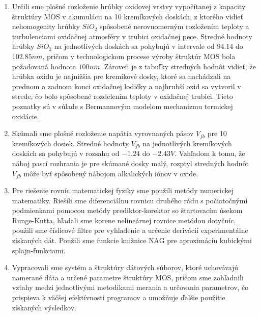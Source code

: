 \begin{enumerate}
\item Určili sme plošné rozloženie hrúbky oxidovej vrstvy vypočítanej
  z kapacity štruktúry MOS v akumulácii na 10 kremíkových doskách, z
  ktorého vidieť nehomogenity hrúbky $SiO_{2}$ spôsobené nerovnomerným
  rozložením teploty a turbulenciami oxidačnej atmosféry v trubici
  oxidačnej pece.
  Stredné hodnoty hrúbky $SiO_{2}$ na jednotlivých doskách sa pohybujú
  v intervale od $94.14$ do $102.85nm$, pričom v technologickom
  procese výroby štruktúr MOS bola požadovaná hodnota $100 nm$.
  Zároveň je z tabuľky stredných hodnôt vidieť, že hrúbka oxidu je
  najnižšia pre kremíkové dosky, ktoré sa nachádzali na prednom a
  zadnom konci oxidačnej lodičky a najhrubší oxid sa vytvoril v
  strede, čo bolo spôsobené rozdelením teploty v oxidačnej
  trubici. Tieto poznatky sú v súlade s Bermannovým modelom mechanizmu
  termickej oxidácie.

\item Skúmali sme plošné rozloženie napätia vyrovnaných pásov $V_{fb}$
  pre 10 kremíkových dosiek. Stredné hodnoty $V_{fb}$ na jednotlivých
  kremíkových doskách sa pohybujú v rozsahu od $-1.24$ do $-2.43
  V$. Vzhľadom k tomu, že náboj pascí rozhrania je pre skúmané dosky
  malý, rozptyl stredných hodnôt $V_{fb}$ môže byť spôsobený nábojom
  alkalických iónov v oxide.

\item Pre riešenie rovníc matematickej fyziky sme použili metódy
  numerickej matematiky. Riešili sme diferenciálnu rovnicu druhého
  rádu s počiatočnými podmienkami pomocou metódy prediktor-korektor so
  štartovacím úsekom Runge-Kutta, hľadali sme korene nelineárnej
  rovnice metódou dotyčníc, použili sme číslicové filtre pre
  vyhladenie a určenie derivácií experimentálne získaných dát. Použili
  sme funkcie knižnice NAG pre aproximáciu kubickými splajn-funkciami.

\item Vypracovali sme systém a štruktúry dátových súborov, ktoré
  uchovávajú namerané dáta a určené parametre štruktúry MOS, pričom
  sme zohľadnili vzťahy medzi jednotlivými metodikami merania a
  určovania parametrov, čo prispieva k väčšej efektívnosti programov a
  umožňuje ďalšie použitie získaných výsledkov.

\end{enumerate}

